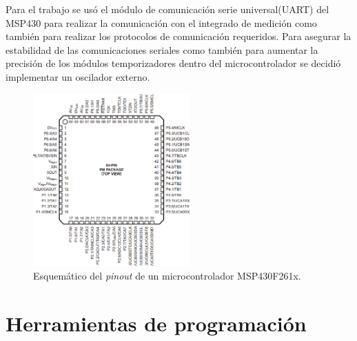 Para el trabajo se usó el módulo de comunicación serie universal(UART) del MSP430 para realizar la comunicación con el integrado de medición como también para realizar los protocolos de comunicación requeridos. Para asegurar la estabilidad de las comunicaciones seriales como también para aumentar la precisión de los módulos temporizadores dentro del microcontrolador se decidió implementar un oscilador externo.

\begin{figure}[!h]
	\centering
	\includegraphics[width=60mm,keepaspectratio]{Figures/microdatasheet1.png}
	\caption{Esquemático del \textit{pinout} de un microcontrolador MSP430F261x.}
	\label{fig:msp430squematic}
\end{figure}






\section{Herramientas de programación}
\label{sec:cap2parte2}
